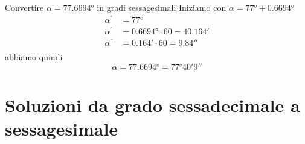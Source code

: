 \begin{exercise}
	Convertire $\alpha=\ang{77.6694}$ in gradi sessagesimali
	\tcblower
	Iniziamo con 
	$\alpha=\ang{77}+\ang{0.6694}$
	\begin{align*}
	\alpha^{\si{\degree}}&=\ang{77}\\ 
	\alpha^{\si{\arcminute}}&=\ang{0.6694}\cdot 60=\ang{;40.164;}\\
	\alpha^{\si{\arcsecond}}&=\ang{;0.164;}\cdot 60=\ang{;;9.84}\\
	\end{align*}
	abbiamo quindi
	\[\alpha=\ang{77.6694}=\ang{77;40;9}\]
\end{exercise}
\tcbstoprecording
\newpage
\section{Soluzioni da grado sessadecimale a sessagesimale}
\tcbinputrecords